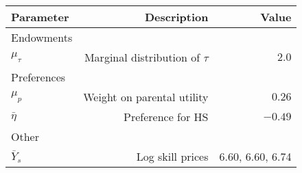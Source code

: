 \begin{tabular}{lrr}
\hline
Parameter & Description  & Value  \\ 
\hline
Endowments &   &   \\ 
$\mu_{\tau}$ & Marginal distribution of $\tau$  & $2.0$  \\ 
Preferences &   &   \\ 
$\mu_{p}$ & Weight on parental utility  & $0.26$  \\ 
$\bar{\eta}$ & Preference for HS  & $-0.49$  \\ 
Other &   &   \\ 
$\bar{Y}_{s}$ & Log skill prices  & 6.60, 6.60, 6.74  \\ 
\hline
\end{tabular}%
